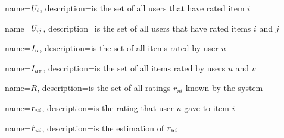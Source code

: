 {
  name={\ensuremath{\Ui}},
  description={is the set of all users that have rated item $i$}
}

{
  name={\ensuremath{\Uij}},
  description={is the set of all users that have rated items $i$ and $j$}
}

{
  name={\ensuremath{\Iu}},
  description={is the set of all items rated by user $u$}
}

{
  name={\ensuremath{\Iuv}},
  description={is the set of all items rated by users $u$ and $v$}
}

{
  name={\ensuremath{R}},
  description={is the set of all ratings $r_{ui}$ known by the system}
}

{
  name={\ensuremath{\rui}},
  description={is the rating that user $u$ gave to item $i$}
}

{
  name={\ensuremath{\predrui}},
  description={is the estimation of $r_{ui}$}
}

\makeglossaries
